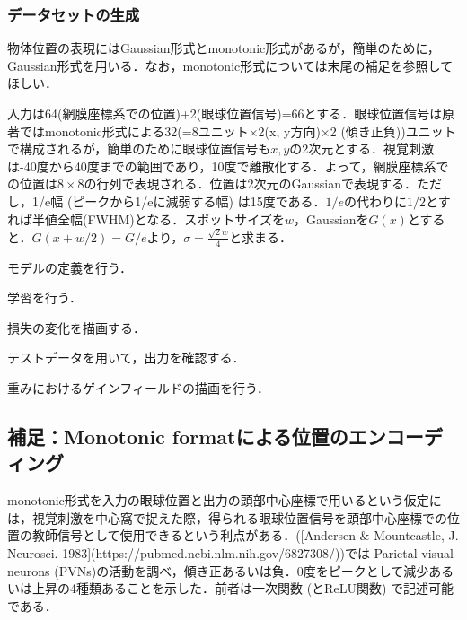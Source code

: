 \subsubsection{データセットの生成}
物体位置の表現にはGaussian形式とmonotonic形式があるが，簡単のために，Gaussian形式を用いる．なお，monotonic形式については末尾の補足を参照してほしい．

入力は64(網膜座標系での位置)+2(眼球位置信号)=66とする．眼球位置信号は原著ではmonotonic形式による32(=8ユニット×2(x, y方向)×2 (傾き正負))ユニットで構成されるが，簡単のために眼球位置信号も$x, y$の2次元とする．視覚刺激は-40度から40度までの範囲であり，10度で離散化する．よって，網膜座標系での位置は$8\times 8$の行列で表現される．位置は2次元のGaussianで表現する．ただし，1/e幅 (ピークから1/eに減弱する幅) は15度である．$1/e$の代わりに$1/2$とすれば半値全幅(FWHM)となる．スポットサイズを$w$，Gaussianを$G(x)$とすると．$G(x+w/2)=G/e$より，$\sigma=\frac{\sqrt{2}w}{4}$と求まる．


モデルの定義を行う．

学習を行う．

損失の変化を描画する．


テストデータを用いて，出力を確認する．


重みにおけるゲインフィールドの描画を行う．


\subsection{補足：Monotonic formatによる位置のエンコーディング}
monotonic形式を入力の眼球位置と出力の頭部中心座標で用いるという仮定には，視覚刺激を中心窩で捉えた際，得られる眼球位置信号を頭部中心座標での位置の教師信号として使用できるという利点がある．([Andersen & Mountcastle, J. Neurosci. 1983](https://pubmed.ncbi.nlm.nih.gov/6827308/))では Parietal visual neurons (PVNs)の活動を調べ，傾き正あるいは負．0度をピークとして減少あるいは上昇の4種類あることを示した．前者は一次関数 (とReLU関数) で記述可能である．


